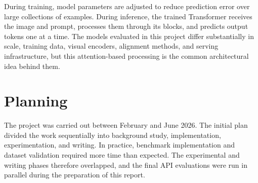 ﻿\documentclass[11pt,a4paper]{article}
\begin{document}
During training, model parameters are adjusted to reduce prediction error over
large collections of examples. During inference, the trained Transformer
receives the image and prompt, processes them through its blocks, and predicts
output tokens one at a time. The models evaluated in this project differ
substantially in scale, training data, visual encoders, alignment methods, and
serving infrastructure, but this attention-based processing is the common
architectural idea behind them.

\section{Planning}

The project was carried out between February and June 2026. The initial
plan divided the work sequentially into background study, implementation,
experimentation, and writing. In practice, benchmark implementation and
dataset validation required more time than expected. The experimental and
writing phases therefore overlapped, and the final API evaluations were run
in parallel during the preparation of this report.
\end{document}
